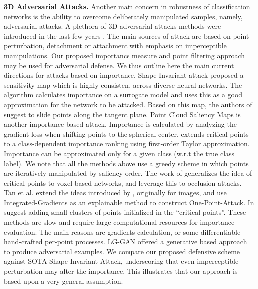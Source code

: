 \documentclass[10pt,twocolumn,letterpaper]{article}
\begin{document}
\textbf{3D Adversarial Attacks.}
Another main concern in robustness of classification networks  is the ability to overcome deliberately manipulated samples, namely, adversarial attacks. 
A plethora of 3D adversarial attacks methods were introduced in the last few years \cite{minimal_adversarial, adversarial_shape_perturbations, shape_adv, robust_adversarial_objects, saliency_maps, adversarial_attack_and_defense, explainable_one_point_attack, Generating_3d_adversarial_point_clouds, advpc, lg_gan, isometry_attack, deep_learning_in_an_adversarial_setting, shape_invariant}. The main sources of attack are based on point perturbation, detachment or attachment with emphasis on imperceptible manipulations. Our proposed importance measure and point filtering approach may be used for adversarial defense. 
We thus outline here the main current directions for attacks based on importance.
Shape-Invariant attack\cite{shape_invariant} proposed a sensitivity map which is highly consistent across diverse neural networks. The algorithm calculates importance on a surrogate model and uses this as a good approximation for the network to be attacked. Based on this map, the authors of \cite{shape_invariant}  suggest to slide points along the tangent plane. 
Point Cloud Saliency Maps \cite{saliency_maps} is another importance based attack. Importance is calculated by analyzing the gradient loss when shifting points to the spherical center. 
\cite{adversarial_attack_and_defense} extends critical-points to a class-dependent importance ranking using first-order Taylor approximation. Importance can be approximated only for a given class (w.r.t the true class label). We note that all the methods above use a greedy scheme in  which points are iteratively manipulated by saliency order.
The work of \cite{deep_learning_in_an_adversarial_setting} generalizes the idea of critical points\cite{pointnet} to voxel-based networks, and leverage this to occlusion attacks.
Tan et al. \cite{explainable_one_point_attack} extend the ideas introduced by \cite{axiomatic}, originally for images, and use Integrated-Gradients as an explainable method to construct One-Point-Attack.
In \cite{Generating_3d_adversarial_point_clouds} suggest adding small clusters of points initialized in the ``critical points''.
These methods are slow and require large computational resources for importance evaluation. The main reasons are gradients calculation, or some differentiable hand-crafted per-point processes.
LG-GAN\cite{lg_gan} offered a generative based approach to produce adversarial examples.
We compare our proposed defensive scheme against SOTA Shape-Invariant Attack\cite{shape_invariant}, underscoring that even imperceptible perturbation may alter the importance. This illustrates that our approach is based upon a very general assumption.
\end{document}
